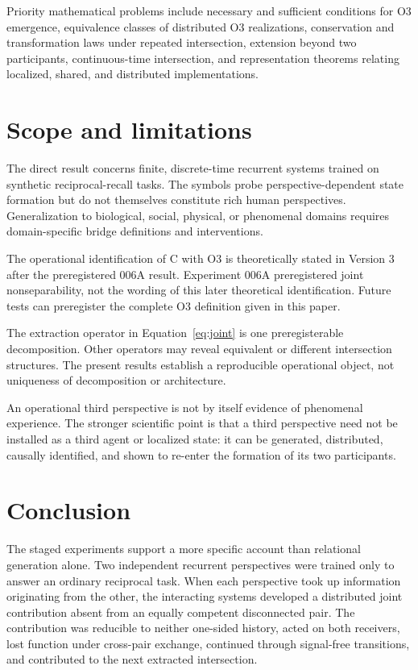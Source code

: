 \documentclass[11pt,a4paper]{article}
\begin{document}
Priority mathematical problems include necessary and sufficient conditions for O3 emergence, equivalence classes of distributed O3 realizations, conservation and transformation laws under repeated intersection, extension beyond two participants, continuous-time intersection, and representation theorems relating localized, shared, and distributed implementations.

\section{Scope and limitations}

The direct result concerns finite, discrete-time recurrent systems trained on synthetic reciprocal-recall tasks. The symbols probe perspective-dependent state formation but do not themselves constitute rich human perspectives. Generalization to biological, social, physical, or phenomenal domains requires domain-specific bridge definitions and interventions.

The operational identification of C with O3 is theoretically stated in Version 3 after the preregistered 006A result. Experiment 006A preregistered joint nonseparability, not the wording of this later theoretical identification. Future tests can preregister the complete O3 definition given in this paper.

The extraction operator in Equation~\eqref{eq:joint} is one preregisterable decomposition. Other operators may reveal equivalent or different intersection structures. The present results establish a reproducible operational object, not uniqueness of decomposition or architecture.

An operational third perspective is not by itself evidence of phenomenal experience. The stronger scientific point is that a third perspective need not be installed as a third agent or localized state: it can be generated, distributed, causally identified, and shown to re-enter the formation of its two participants.

\section{Conclusion}

The staged experiments support a more specific account than relational generation alone. Two independent recurrent perspectives were trained only to answer an ordinary reciprocal task. When each perspective took up information originating from the other, the interacting systems developed a distributed joint contribution absent from an equally competent disconnected pair. The contribution was reducible to neither one-sided history, acted on both receivers, lost function under cross-pair exchange, continued through signal-free transitions, and contributed to the next extracted intersection.
\end{document}

